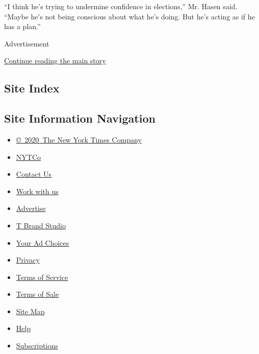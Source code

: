 ``I think he's trying to undermine confidence in elections,'' Mr. Hasen
said. ``Maybe he's not being conscious about what he's doing. But he's
acting as if he has a plan.''

Advertisement

\protect\hyperlink{after-bottom}{Continue reading the main story}

\hypertarget{site-index}{%
\subsection{Site Index}\label{site-index}}

\hypertarget{site-information-navigation}{%
\subsection{Site Information
Navigation}\label{site-information-navigation}}

\begin{itemize}
\tightlist
\item
  \href{https://help.nytimes3xbfgragh.onion/hc/en-us/articles/115014792127-Copyright-notice}{©~2020~The
  New York Times Company}
\end{itemize}

\begin{itemize}
\tightlist
\item
  \href{https://www.nytco.com/}{NYTCo}
\item
  \href{https://help.nytimes3xbfgragh.onion/hc/en-us/articles/115015385887-Contact-Us}{Contact
  Us}
\item
  \href{https://www.nytco.com/careers/}{Work with us}
\item
  \href{https://nytmediakit.com/}{Advertise}
\item
  \href{http://www.tbrandstudio.com/}{T Brand Studio}
\item
  \href{https://www.nytimes3xbfgragh.onion/privacy/cookie-policy\#how-do-i-manage-trackers}{Your
  Ad Choices}
\item
  \href{https://www.nytimes3xbfgragh.onion/privacy}{Privacy}
\item
  \href{https://help.nytimes3xbfgragh.onion/hc/en-us/articles/115014893428-Terms-of-service}{Terms
  of Service}
\item
  \href{https://help.nytimes3xbfgragh.onion/hc/en-us/articles/115014893968-Terms-of-sale}{Terms
  of Sale}
\item
  \href{https://spiderbites.nytimes3xbfgragh.onion}{Site Map}
\item
  \href{https://help.nytimes3xbfgragh.onion/hc/en-us}{Help}
\item
  \href{https://www.nytimes3xbfgragh.onion/subscription?campaignId=37WXW}{Subscriptions}
\end{itemize}
